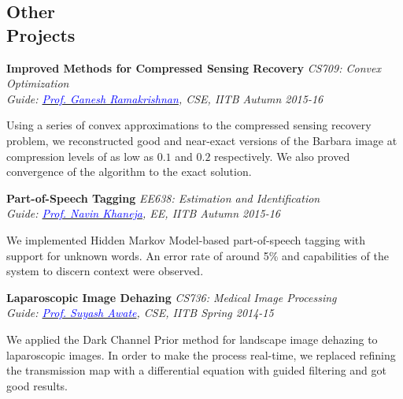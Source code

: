 \documentclass[margin,line]{res}
\newenvironment{list1}{
  \begin{list}{\ding{113}}{%
      \setlength{\itemsep}{0in}
      \setlength{\parsep}{0in} \setlength{\parskip}{0in}
      \setlength{\topsep}{0in} \setlength{\partopsep}{0in} 
      \setlength{\leftmargin}{0.17in}}}{\end{list}}
\begin{document}
\begin{resume}
\section{\sc Other \\Projects}
{\bf Improved Methods for Compressed Sensing Recovery} \hfill {\it CS709: Convex Optimization}\\
{\em Guide: \href{https://www.cse.iitb.ac.in/~ganesh/}{\textcolor{blue}{Prof. Ganesh Ramakrishnan}}, CSE, IITB \hfill Autumn 2015-16}\\
\vspace*{-.15in}
\begin{list1}
\item[] Using a series of convex approximations to the compressed sensing recovery problem, we reconstructed good and near-exact versions of the Barbara image at compression levels of as low as $0.1$ and $0.2$ respectively. We also proved convergence of the algorithm to the exact solution.
\end{list1}

\vspace*{-0.1in}

{\bf Part-of-Speech Tagging} \hfill \textit{EE638: Estimation and Identification}\\
{\em Guide: \href{https://www.ee.iitb.ac.in/course/~ee638/Navin}{\textcolor{blue}{Prof. Navin Khaneja}}, EE, IITB \hfill Autumn 2015-16}\\
\vspace*{-.15in}
\begin{list1}
\item[] We implemented Hidden Markov Model-based part-of-speech tagging with support for unknown words. An error rate of around 5\% and capabilities of the system to discern context were observed.
\end{list1}

\vspace*{-0.1in}

{\bf Laparoscopic Image Dehazing} \hfill \textit{CS736: Medical Image Processing}\\
{\em Guide: \href{https://www.cse.iitb.ac.in/~suyash}{\textcolor{blue}{Prof. Suyash Awate}}, CSE, IITB \hfill Spring 2014-15}\\
\vspace*{-.15in}
\begin{list1}
\item[] We applied the Dark Channel Prior method for landscape image dehazing to laparoscopic images. In order to make the process real-time, we replaced refining the transmission map with a differential equation with guided filtering and got good results.
\end{list1}


\end{resume}
\end{document}
